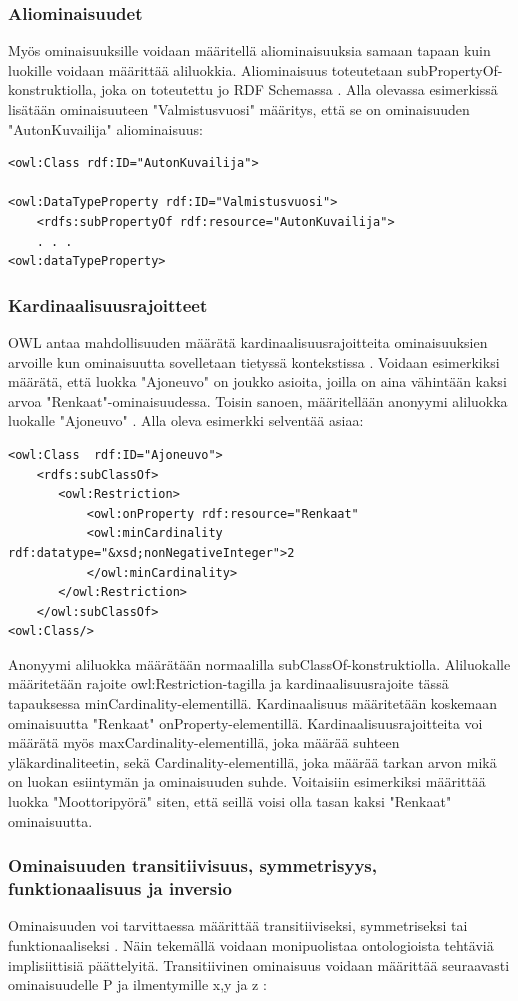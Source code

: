 \documentclass[finnish]{tktltiki2}
\theoremstyle{definition}
\theoremstyle{remark}
\begin{document}
\subsubsection{Aliominaisuudet}
Myös ominaisuuksille voidaan määritellä aliominaisuuksia samaan tapaan kuin luokille voidaan määrittää aliluokkia. Aliominaisuus toteutetaan subPropertyOf-konstruktiolla, joka on toteutettu jo RDF Schemassa \cite{SWM04}. Alla olevassa esimerkissä lisätään ominaisuuteen "Valmistusvuosi" määritys, että se on ominaisuuden "AutonKuvailija" aliominaisuus:
\begin{verbatim}
<owl:Class rdf:ID="AutonKuvailija">

<owl:DataTypeProperty rdf:ID="Valmistusvuosi">
    <rdfs:subPropertyOf rdf:resource="AutonKuvailija">
    . . .
<owl:dataTypeProperty>
\end{verbatim}

\subsubsection{Kardinaalisuusrajoitteet}
OWL antaa mahdollisuuden määrätä kardinaalisuusrajoitteita ominaisuuksien arvoille kun ominaisuutta sovelletaan tietyssä kontekstissa \cite{SWM04}. Voidaan esimerkiksi määrätä, että luokka "Ajoneuvo" on joukko asioita, joilla on aina vähintään kaksi arvoa "Renkaat"-ominaisuudessa. Toisin sanoen, määritellään anonyymi aliluokka luokalle "Ajoneuvo" \cite{SWM04}. Alla oleva esimerkki selventää asiaa:
\begin{verbatim}
<owl:Class  rdf:ID="Ajoneuvo">
    <rdfs:subClassOf>
       <owl:Restriction>
           <owl:onProperty rdf:resource="Renkaat"
           <owl:minCardinality rdf:datatype="&xsd;nonNegativeInteger">2
           </owl:minCardinality>
       </owl:Restriction>
    </owl:subClassOf>
<owl:Class/>
\end{verbatim}
Anonyymi aliluokka määrätään normaalilla subClassOf-konstruktiolla. Aliluokalle määritetään rajoite owl:Restriction-tagilla ja kardinaalisuusrajoite tässä tapauksessa  minCardinality-elementillä. Kardinaalisuus määritetään koskemaan ominaisuutta "Renkaat" onProperty-elementillä. Kardinaalisuusrajoitteita voi määrätä myös maxCardinality-elementillä, joka määrää suhteen yläkardinaliteetin, sekä Cardinality-elementillä, joka määrää tarkan arvon mikä on luokan esiintymän ja ominaisuuden suhde. Voitaisiin esimerkiksi määrittää luokka "Moottoripyörä" siten, että seillä voisi olla tasan kaksi "Renkaat" ominaisuutta.   

\subsubsection{Ominaisuuden transitiivisuus, symmetrisyys, funktionaalisuus ja inversio}
Ominaisuuden voi tarvittaessa määrittää transitiiviseksi, symmetriseksi tai funktionaaliseksi \cite{SWM04}. Näin tekemällä voidaan monipuolistaa ontologioista tehtäviä implisiittisiä päättelyitä.  Transitiivinen ominaisuus voidaan määrittää seuraavasti ominaisuudelle P ja ilmentymille x,y ja z \cite{SWM04}:
\end{document}
